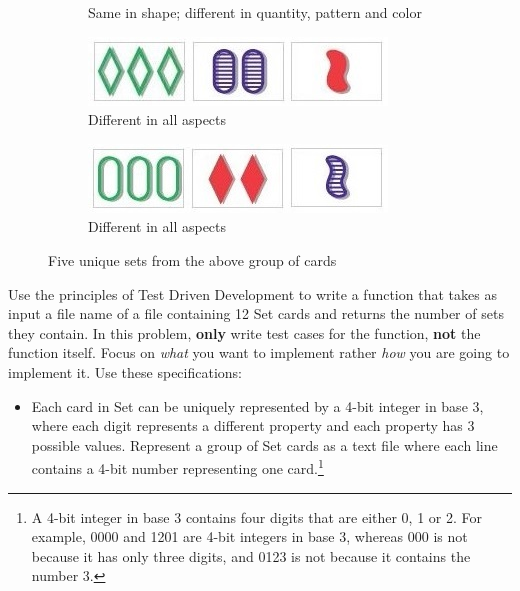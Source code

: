 \begin{problem}
\begin{figure}[H]
\begin{subfigure}{.47\textwidth}
    \caption{Same in shape; different in quantity, pattern and color}
    \label{fig:labeltheotherfigure}
\end{subfigure}
\begin{subfigure}{.47\textwidth}
    \centering
    \includegraphics[width=\linewidth]{figures/set4.jpg}
    \caption{Different in all aspects}
    \label{fig:labeltheotherfigure}
\end{subfigure}
\begin{subfigure}{.47\textwidth}
    \centering
    \includegraphics[width=\linewidth]{figures/set5.jpg}
    \caption{Different in all aspects}
    \label{fig:labeltheotherfigure}
\end{subfigure}
\caption{Five unique sets from the above group of cards}
\end{figure}

\vspace{5mm}

Use the principles of Test Driven Development to write a function that takes as input a file name of a file containing 12 Set cards and returns the number of sets they contain. In this problem, \textbf{only} write test cases for the function, \textbf{not} the function itself. Focus on \emph{what} you want to implement rather \emph{how} you are going to implement it. Use these specifications:
\begin{itemize}
\item Each card in Set can be uniquely represented by a 4-bit integer in base 3, where each digit represents a different property and each property has 3 possible values. Represent a group of Set cards as a text file where each line contains a 4-bit number representing one card.\footnote{A 4-bit integer in base 3 contains four digits that are either 0, 1 or 2. For example, 0000 and 1201 are 4-bit integers in base 3, whereas 000 is not because it has only three digits, and 0123 is not because it contains the number 3.}


\end{itemize}
\end{problem}
